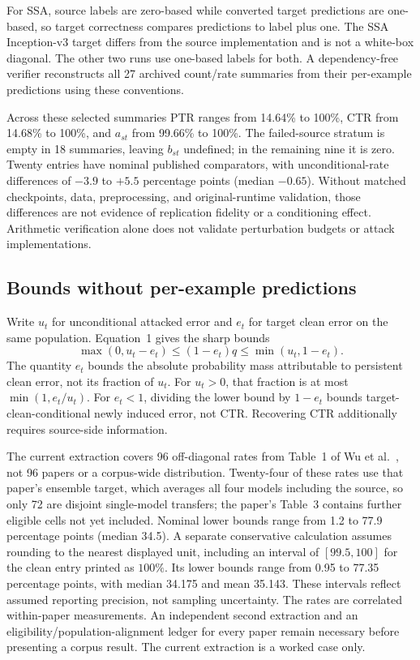 \documentclass[10pt]{article}
\begin{document}
For SSA, source labels are zero-based while converted target predictions are one-based, so target correctness compares predictions to label plus one. The SSA Inception-v3 target differs from the source implementation and is not a white-box diagonal. The other two runs use one-based labels for both. A dependency-free verifier reconstructs all 27 archived count/rate summaries from their per-example predictions using these conventions.

Across these selected summaries PTR ranges from 14.64\% to 100\%, CTR from 14.68\% to 100\%, and $a_{st}$ from 99.66\% to 100\%. The failed-source stratum is empty in 18 summaries, leaving $b_{st}$ undefined; in the remaining nine it is zero. Twenty entries have nominal published comparators, with unconditional-rate differences of $-3.9$ to $+5.5$ percentage points (median $-0.65$). Without matched checkpoints, data, preprocessing, and original-runtime validation, those differences are not evidence of replication fidelity or a conditioning effect. Arithmetic verification alone does not validate perturbation budgets or attack implementations.

\subsection{Bounds without per-example predictions}
Write $u_t$ for unconditional attacked error and $e_t$ for target clean error on the same population. Equation~1 gives the sharp bounds
\begin{equation}
\max(0,u_t-e_t)\leq (1-e_t)q\leq\min(u_t,1-e_t).
\end{equation}
The quantity $e_t$ bounds the absolute probability mass attributable to persistent clean error, not its fraction of $u_t$. For $u_t>0$, that fraction is at most $\min(1,e_t/u_t)$. For $e_t<1$, dividing the lower bound by $1-e_t$ bounds target-clean-conditional newly induced error, not CTR. Recovering CTR additionally requires source-side information.

The current extraction covers 96 off-diagonal rates from Table~1 of Wu et al.\ \citep{wu2020}, not 96 papers or a corpus-wide distribution. Twenty-four of these rates use that paper's ensemble target, which averages all four models including the source, so only 72 are disjoint single-model transfers; the paper's Table~3 contains further eligible cells not yet included. Nominal lower bounds range from 1.2 to 77.9 percentage points (median 34.5). A separate conservative calculation assumes rounding to the nearest displayed unit, including an interval of $[99.5,100]$ for the clean entry printed as $100\%$. Its lower bounds range from 0.95 to 77.35 percentage points, with median 34.175 and mean 35.143. These intervals reflect assumed reporting precision, not sampling uncertainty. The rates are correlated within-paper measurements. An independent second extraction and an eligibility/population-alignment ledger for every paper remain necessary before presenting a corpus result. The current extraction is a worked case only.
\end{document}
